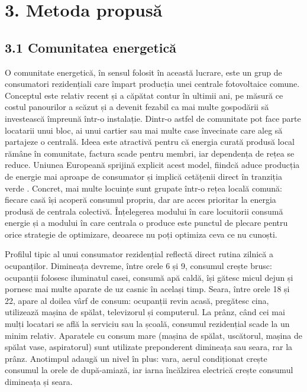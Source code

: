 \documentclass[12pt,a4paper]{report}
\begin{document}
\clearpage

\chapter*{3. Metoda propusă}

\section*{3.1 Comunitatea energetică}

O comunitate energetică, în sensul folosit în această lucrare, este un grup de consumatori rezidențiali care împart producția unei centrale fotovoltaice comune. Conceptul este relativ recent și a căpătat contur în ultimii ani, pe măsură ce costul panourilor a scăzut și a devenit fezabil ca mai multe gospodării să investească împreună într-o instalație. Dintr-o astfel de comunitate pot face parte locatarii unui bloc, ai unui cartier sau mai multe case învecinate care aleg să partajeze o centrală. Ideea este atractivă pentru că energia curată produsă local rămâne în comunitate, factura scade pentru membri, iar dependența de rețea se reduce. Uniunea Europeană sprijină explicit acest model, fiindcă aduce producția de energie mai aproape de consumator și implică cetățenii direct în tranziția verde \cite{barabino2023energycommunities, europeansolarstrategy2022}. Concret, mai multe locuințe sunt grupate într-o rețea locală comună: fiecare casă își acoperă consumul propriu, dar are acces prioritar la energia produsă de centrala colectivă. Înțelegerea modului în care locuitorii consumă energie și a modului în care centrala o produce este punctul de plecare pentru orice strategie de optimizare, deoarece nu poți optimiza ceva ce nu cunoști.

Profilul tipic al unui consumator rezidențial reflectă direct rutina zilnică a ocupanților. Dimineața devreme, între orele 6 și 9, consumul crește brusc: ocupanții folosesc iluminatul casei, consumă apă caldă, își gătesc micul dejun și pornesc mai multe aparate de uz casnic în același timp. Seara, între orele 18 și 22, apare al doilea vârf de consum: ocupanții revin acasă, pregătesc cina, utilizează mașina de spălat, televizorul și computerul. La prânz, când cei mai mulți locatari se află la serviciu sau la școală, consumul rezidențial scade la un minim relativ. Aparatele cu consum mare (mașina de spălat, uscătorul, mașina de spălat vase, aspiratorul) sunt utilizate preponderent dimineața sau seara, rar la prânz. Anotimpul adaugă un nivel în plus: vara, aerul condiționat crește consumul la orele de după-amiază, iar iarna încălzirea electrică crește consumul dimineața și seara.
\end{document}

